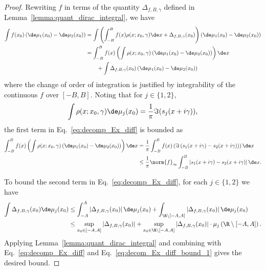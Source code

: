 \begin{proof}
Rewriting $f$ in terms of the quantity $\Delta_{f,B,\gamma}$ defined in Lemma~\ref{lemma:quant_dirac_integral}, we have
\begin{align}
\nonumber
    \int f(x_0) \left(\de \mu_1(x_0) - \de \mu_2(x_0)\right) 
    &= \int\left( \int_{-B}^B f(x) \rho(x;x_0, \gamma) \de x  + \Delta_{f,B,\gamma}(x_0) \right) 
     \left(\de \mu_1(x_0) - \de \mu_2(x_0)\right) \\
     \nonumber
    &= 
     \int_{-B}^B f(x)\left(\int  \rho(x;x_0, \gamma) 
     \left(\de \mu_1(x_0) - \de \mu_2(x_0)\right) \right)\de x\\
     &\quad\quad+
\int \Delta_{f,B,\gamma}(x_0)
    \left(\de \mu_1(x_0) - \de \mu_2(x_0)\right)
     \label{eq:decomp_Ex_diff}
\end{align}
where the change of order of integration is justified by integrability of the continuous $f$ over $[-B,B]$.
Noting that
for $j\in\{1,2\}$,
\begin{equation}
\nonumber
     \int \rho(x;x_0,\gamma) \de \mu_j(x_0)=
     \frac1{\pi}\Im(s_j(x+i\gamma)),
\end{equation}
the first term in Eq.~\eqref{eq:decomp_Ex_diff} is bounded as
\begin{align}
\nonumber
     \int_{-B}^B f(x)\left(\int  \rho(x;x_0, \gamma) 
     \left(\de \mu_1(x_0) - \de \mu_2(x_0)\right) \right)\de x 
     &=
     \frac1\pi\int_{-B}^B f(x) \left(
    \Im\left(s_1(x + i \gamma) - s_2(x+ i\gamma)\right)
     \right)
     \de x\\
     &\le \frac1\pi \norm{f}_\infty \int_{-B}^B \left|s_1(x + i \gamma) - s_2(x+ i\gamma)\right| \de x.
     \label{eq:decom_Ex_diff_bound_1}
\end{align}

To bound the second term in Eq.~\eqref{eq:decomp_Ex_diff}, 
for each $j\in\{1,2\}$
we have
\begin{align*}
   \int \Delta_{f,B,\gamma}(x_0) \de \mu_j(x_0)  
   &\le  \int_{-A}^A \left|\Delta_{f,B,\gamma}(x_0)\right| \de \mu_j(x_0)+ \int_{\R\setminus[-A,A]} \left|\Delta_{f,B,\gamma}(x_0) \right|\de \mu_j(x_0)\\
   &\le  
\sup_{x_0 \in [-A,A]} \left|\Delta_{f,B,\gamma}(x_0)\right|
        +
        \sup_{x_0 \in \R\setminus [-A,A]} \left|\Delta_{f,B,\gamma}(x_0)\right| \cdot
        \mu_j\left(\R \setminus [-A,A]\right).
\end{align*} 
Applying Lemma~\ref{lemma:quant_dirac_integral} and combining with Eq.~\eqref{eq:decomp_Ex_diff} and Eq.~\eqref{eq:decom_Ex_diff_bound_1} gives the desired bound.


\end{proof}



